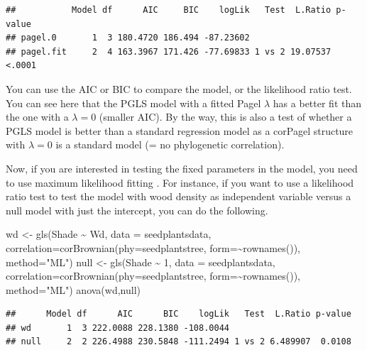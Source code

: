 \documentclass[
]{book}
\newenvironment{Shaded}{\begin{snugshade}}{\end{snugshade}}
\newcommand{\AttributeTok}[1]{\textcolor[rgb]{0.77,0.63,0.00}{#1}}
\newcommand{\DecValTok}[1]{\textcolor[rgb]{0.00,0.00,0.81}{#1}}
\newcommand{\FunctionTok}[1]{\textcolor[rgb]{0.00,0.00,0.00}{#1}}
\newcommand{\NormalTok}[1]{#1}
\newcommand{\OtherTok}[1]{\textcolor[rgb]{0.56,0.35,0.01}{#1}}
\newcommand{\SpecialCharTok}[1]{\textcolor[rgb]{0.00,0.00,0.00}{#1}}
\newcommand{\StringTok}[1]{\textcolor[rgb]{0.31,0.60,0.02}{#1}}
\begin{document}
\begin{verbatim}
##           Model df      AIC     BIC    logLik   Test  L.Ratio p-value
## pagel.0       1  3 180.4720 186.494 -87.23602                        
## pagel.fit     2  4 163.3967 171.426 -77.69833 1 vs 2 19.07537  <.0001
\end{verbatim}

You can use the AIC or BIC to compare the model, or the likelihood ratio test. You can see here that the PGLS model with a fitted Pagel \(\lambda\) has a better fit than the one with a \(\lambda=0\) (smaller AIC). By the way, this is also a test of whether a PGLS model is better than a standard regression model as a corPagel structure with \(\lambda=0\) is a standard model (= no phylogenetic correlation).

Now, if you are interested in testing the fixed parameters in the model, you need to use maximum likelihood fitting \citep{zuur2009mixed}. For instance, if you want to use a likelihood ratio test to test the model with wood density as independent variable versus a null model with just the intercept, you can do the following.

\begin{Shaded}
\begin{Highlighting}[]
\NormalTok{wd }\OtherTok{\textless{}{-}} \FunctionTok{gls}\NormalTok{(Shade }\SpecialCharTok{\textasciitilde{}}\NormalTok{ Wd, }\AttributeTok{data =}\NormalTok{ seedplantsdata,}
          \AttributeTok{correlation=}\FunctionTok{corBrownian}\NormalTok{(}\AttributeTok{phy=}\NormalTok{seedplantstree, }\AttributeTok{form=}\SpecialCharTok{\textasciitilde{}}\FunctionTok{rownames}\NormalTok{()), }
          \AttributeTok{method=}\StringTok{"ML"}\NormalTok{)}
\NormalTok{null }\OtherTok{\textless{}{-}} \FunctionTok{gls}\NormalTok{(Shade }\SpecialCharTok{\textasciitilde{}} \DecValTok{1}\NormalTok{, }\AttributeTok{data =}\NormalTok{ seedplantsdata,}
            \AttributeTok{correlation=}\FunctionTok{corBrownian}\NormalTok{(}\AttributeTok{phy=}\NormalTok{seedplantstree, }\AttributeTok{form=}\SpecialCharTok{\textasciitilde{}}\FunctionTok{rownames}\NormalTok{()), }
            \AttributeTok{method=}\StringTok{"ML"}\NormalTok{)}
\FunctionTok{anova}\NormalTok{(wd,null)}
\end{Highlighting}
\end{Shaded}

\begin{verbatim}
##      Model df      AIC      BIC    logLik   Test  L.Ratio p-value
## wd       1  3 222.0088 228.1380 -108.0044                        
## null     2  2 226.4988 230.5848 -111.2494 1 vs 2 6.489907  0.0108
\end{verbatim}
\end{document}
